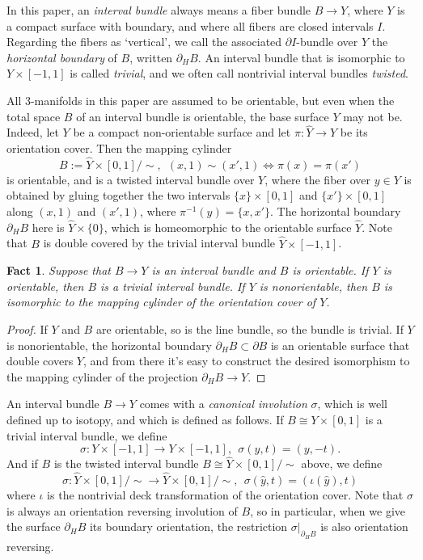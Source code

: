 \documentclass[12pt]{amsart}
\newtheorem{fact}[theorem]{Fact}
\theoremstyle{definition}
\theoremstyle{remark}
\begin{document}
In this paper, an \emph{interval bundle} always means a fiber bundle $B \longrightarrow Y$, where $Y $ is a compact surface with boundary, and where all fibers are closed intervals $I$. Regarding the fibers as `vertical', we call the associated $\partial I$-bundle over $Y$ the \emph {horizontal boundary} of $B$, written $\partial_H B$. An interval bundle that is isomorphic to $Y \times[-1,1]$ is called \emph{trivial}, and we often call nontrivial interval bundles \emph{twisted}.

All $3$-manifolds in this paper are assumed to be orientable, but even when the total space $B$ of an interval bundle is orientable, the base surface $Y$ may not be. Indeed, let $Y$ be a compact non-orientable surface and let $\pi: \hat Y \longrightarrow Y$ be its orientation cover. Then the mapping cylinder $$B := \hat Y \times [0,1] / \sim, \ \ (x,1)\sim(x',1) \iff \pi(x)=\pi(x')$$ 
is orientable, and is a twisted interval bundle over $Y$, where the fiber over $y\in Y$ is obtained by gluing together the two intervals $\{x\}\times [0,1]$ and $\{x'\}\times [0,1]$ along $(x,1)$ and $(x',1)$, where $\pi^{-1}(y)=\{x,x'\}$. The horizontal boundary $\partial_H B$ here is $\hat Y \times \{0\}$, which is homeomorphic to the orientable surface $\hat Y$. Note that $B$ is double covered by the trivial interval bundle $\hat Y \times [-1,1]$.


\begin{fact}
Suppose that $B\longrightarrow Y$ is an interval bundle and $B$ is orientable. If $Y$ is orientable, then $B$ is a trivial interval bundle. If $Y$ is nonorientable, then $B$ is isomorphic to the mapping cylinder of the orientation cover of $Y$.
\end{fact}
\begin{proof}
If $Y$ and $B$ are orientable, so is the line bundle, so the bundle is trivial. If $Y$ is nonorientable, the horizontal boundary $\partial_H B\subset \partial B$ is an orientable surface that double covers $Y$, and from there it's easy to construct the desired isomorphism to the mapping cylinder of the projection $\partial_H B \longrightarrow Y$.
\end{proof}

An interval bundle $B\longrightarrow Y$ comes with a \emph{canonical involution} $\sigma$, which is well defined up to isotopy, and which is defined as follows. If $B\cong Y \times [0,1]$ is a trivial interval bundle, we define $$\sigma : Y \times [-1,1] \longrightarrow Y \times [-1,1], \ \  \sigma(y,t)=(y,-t).$$
And if $B$ is the twisted interval bundle $B \cong \hat Y \times [0,1] / \sim$ above, we define $$\sigma : \hat Y \times [0,1] / \sim \longrightarrow \hat Y \times [0,1] / \sim, \ \ \sigma(\hat y,t) = (\iota(\hat y),t)$$ 
where $\iota$ is the nontrivial deck transformation of the orientation cover. Note that $\sigma$ is always an orientation reversing involution of $B$, so in particular, when we give the surface $\partial_H B$ its boundary orientation, the restriction $\sigma|_{\partial_HB}$ is also orientation reversing.
\end{document}
